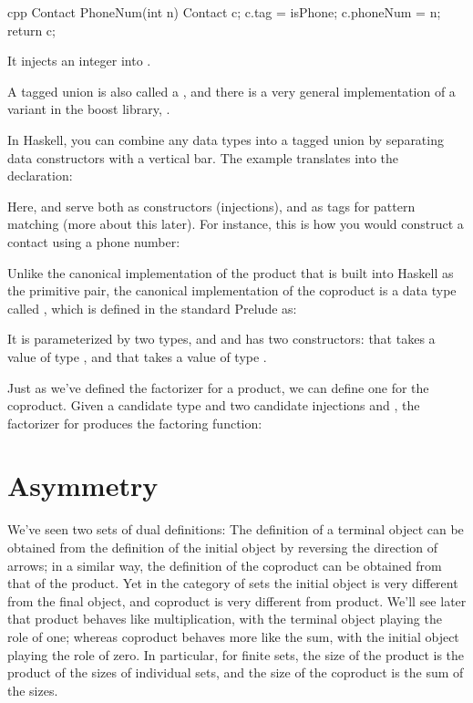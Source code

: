 \begin{snip}{cpp}
Contact PhoneNum(int n) { 
    Contact c;
    c.tag = isPhone;
    c.phoneNum = n;
    return c;
}
\end{snip}
It injects an integer into .

A tagged union is also called a , and there is a very
general implementation of a variant in the boost library,
.

In Haskell, you can combine any data types into a tagged union by
separating data constructors with a vertical bar. The 
example translates into the declaration:

Here,  and  serve both as
constructors (injections), and as tags for pattern matching (more about
this later). For instance, this is how you would construct a contact
using a phone number:

Unlike the canonical implementation of the product that is built into
Haskell as the primitive pair, the canonical implementation of the
coproduct is a data type called , which is defined in the
standard Prelude as:

It is parameterized by two types,  and  and has two
constructors:  that takes a value of type , and
 that takes a value of type .

Just as we've defined the factorizer for a product, we can define one
for the coproduct. Given a candidate type  and two candidate
injections  and , the factorizer for 
produces the factoring function:


\section{Asymmetry}

We've seen two sets of dual definitions: The definition of a terminal
object can be obtained from the definition of the initial object by
reversing the direction of arrows; in a similar way, the definition of
the coproduct can be obtained from that of the product. Yet in the
category of sets the initial object is very different from the final
object, and coproduct is very different from product. We'll see later
that product behaves like multiplication, with the terminal object
playing the role of one; whereas coproduct behaves more like the sum,
with the initial object playing the role of zero. In particular, for
finite sets, the size of the product is the product of the sizes of
individual sets, and the size of the coproduct is the sum of the sizes.

